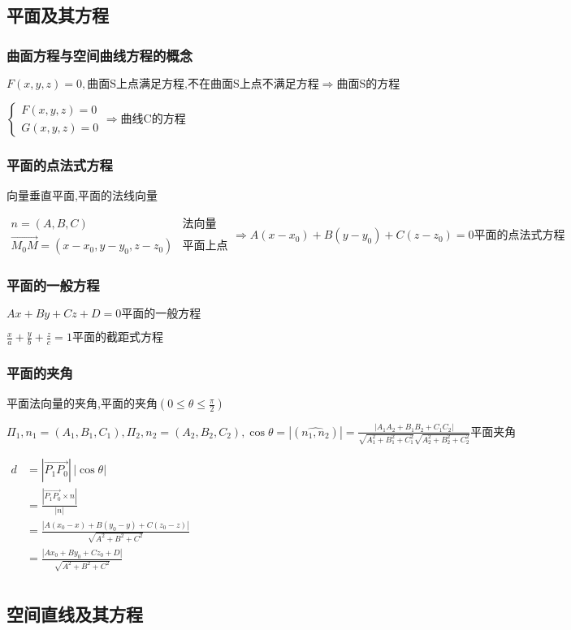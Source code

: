 \documentclass[UTF8]{ctexart}
\newcommand{\mt}[1]{\text{#1}}
\newcommand{\md}[1]{\displaystyle{#1}}
\newcommand{\mf}[1]{\left( #1\right)}
\newcommand{\mfa}[1]{\left| #1\right|}
\newcommand{\mha}[1]{\overrightarrow{#1}}
\newcommand{\p}{\par}
\newcommand{\ma}[1]{\begin{array}{llll} #1 \end{array}}
\begin{document}
\subsection{平面及其方程}

\subsubsection{曲面方程与空间曲线方程的概念}

$F\mf{x,y,z}=0,\mt{曲面S上点满足方程,不在曲面S上点不满足方程}\Rightarrow\mt{曲面S的方程}$\p
$\left\{\ma{
    F\mf{x,y,z}=0\\
    G\mf{x,y,z}=0
}\right.\Rightarrow\mt{曲线C的方程}$

\subsubsection{平面的点法式方程}
向量垂直平面,平面的法线向量\p

$\ma{n=\mf{A,B,C}&\mt{法向量}\\ \mha{M_0M}=\mf{x-x_0,y-y_0,z-z_0}&\mt{平面上点}}\Rightarrow 
A\mf{x-x_0}+B\mf{y-y_0}+C\mf{z-z_0}=0\mt{平面的点法式方程}$

\subsubsection{平面的一般方程}
$Ax+By+Cz+D=0\mt{平面的一般方程}$\p
$\md{\frac{x}{a}+\frac{y}{b}+\frac{z}{c}=1}\mt{平面的截距式方程}$

\subsubsection{平面的夹角}
平面法向量的夹角,平面的夹角$\mf{0\leqslant \theta \leqslant \frac{\pi}{2}}$\p
$\varPi_1,n_1=\mf{A_1,B_1,C_1},\varPi_2,n_2=\mf{A_2,B_2,C_2},\cos \theta=\mfa{\mf{\widehat{n_1,n_2}}}=\md{\frac
{\mfa{A_1A_2+B_1B_2+C_1C_2}}{\sqrt{A_1^2+B_1^2+C_1^2}\sqrt{A_2^2+B_2^2+C_2^2}}}
\mt{平面夹角}$\p
$\ma{d&=\mfa{\mha{P_1P_0}}\,\mfa{\cos \theta}\\
    &=\frac{\mfa{\mha{P_1P_0} \times n}}{\mfa{n}}\\
    &=\frac{\mfa{A\mf{x_0-x}+B\mf{y_0-y}+C\mf{z_0-z}}}{\sqrt{A^2+B^2+C^2}}\\
    &=\frac{\mfa{Ax_0+By_0+Cz_0+D}}{\sqrt{A^2+B^2+C^2}}\\
}$


\subsection{空间直线及其方程}
\end{document}

